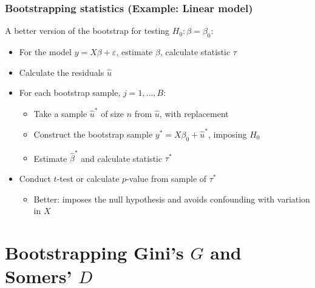 \documentclass{beamer}
\begin{document}

\begin{frame}
\frametitle{Bootstrapping statistics (Example: Linear model)}

A better version of the bootstrap for testing $H_0: \beta = \beta_0$:
\begin{itemize}
    \item For the model $y = X\beta + \varepsilon$, estimate $\beta$, calculate statistic $\tau$
    \item Calculate the residuals $\hat{u}$
    \item For each bootstrap sample, $j = 1, \dots, B$:
    \begin{itemize}
        \item Take a sample $\hat{u}^{*}$ of size $n$ from $\hat{u}$, with replacement
        \item Construct the bootstrap sample $y^{*} = X\beta_0 + \hat{u}^{*}$, imposing $H_0$
        \item Estimate $\hat{\beta}^{*}$ and calculate statistic $\tau^{*}$
    \end{itemize}
    \item Conduct $t$-test or calculate $p$-value from sample of $\tau^{*}$
    \begin{itemize}
        \item Better: imposes the null hypothesis and avoids confounding with variation in $X$
    \end{itemize}
\end{itemize}


\end{frame}



\section{Bootstrapping Gini's $G$ and Somers' $D$}


\end{document}
